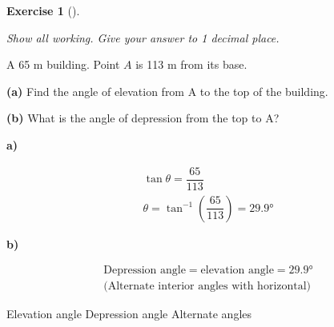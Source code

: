 \documentclass[
  letterpaper,
  DIV=11,
  numbers=noendperiod]{scrreprt}
\theoremstyle{definition}
\newtheorem{exercise}{Exercise}[chapter]
\theoremstyle{remark}
\begin{document}
\begin{exercise}[]\protect\hypertarget{exr-trig-20}{}\label{exr-trig-20}

\emph{Show all working. Give your answer to 1 decimal place.}

A 65 m building. Point \(A\) is 113 m from its base.

\textbf{(a)} Find the angle of elevation from A to the top of the
building.

\textbf{(b)} What is the angle of depression from the top to A?

\begin{tcolorbox}[enhanced jigsaw, opacitybacktitle=0.6, coltitle=black, arc=.35mm, colframe=quarto-callout-tip-color-frame, colback=white, bottomrule=.15mm, left=2mm, colbacktitle=quarto-callout-tip-color!10!white, titlerule=0mm, opacityback=0, title=\textcolor{quarto-callout-tip-color}{\faLightbulb}\hspace{0.5em}{🔍 View Solution}, leftrule=.75mm, breakable, rightrule=.15mm, bottomtitle=1mm, toptitle=1mm, toprule=.15mm]

\textbf{a)}

\[
\begin{aligned}
\tan\theta = \dfrac{65}{113} \\ \theta = \tan^{-1}\!\left(\dfrac{65}{113}\right) = 29.9°
\end{aligned}
\]

\textbf{b)}

\[
\begin{aligned}
\text{Depression angle} = \text{elevation angle} = 29.9° \\ \text{(Alternate interior angles with horizontal)}
\end{aligned}
\]

\end{tcolorbox}

{Elevation angle} {Depression angle} {Alternate angles}

\end{exercise}
\end{document}
